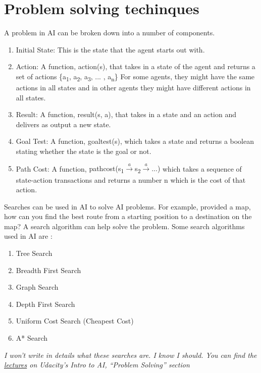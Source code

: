 \documentclass[12pt]{article}
\begin{document}
\section*{Problem solving techinques}
A problem in AI can be broken down into a number of components.
\begin{enumerate}
\item Initial State: This is the state that the agent starts out with.
\item Action: A function, \colorbox{myGray}{action(s)}, that takes in a state of the agent and returns a set of actions \colorbox{myGray}{\{a\textsubscript{1}, a\textsubscript{2}, a\textsubscript{3}, ... , a\textsubscript{n}\} }  For some agents, they might have the same actions in all states and in other agents they might have different actions in all states.
\item Result: A function, \colorbox{myGray}{result(s, a)}, that takes in a state and an action and delivers as output a new state.
\item Goal Test: A function, \colorbox{myGray}{goaltest(s)}, which takes a state and returns a boolean stating whether the state is the goal or not.
\item Path Cost: A function, \colorbox{myGray}{pathcost(s\textsubscript{1}$\xrightarrow{a}$s\textsubscript{2}$\xrightarrow{a}$...)} which takes a sequence of state-action transactions and returns a number \colorbox{myGray}{n} which is the cost of that action.
\end{enumerate}
\par
Searches can be used in AI to solve AI problems. For example, provided a map, how can you find the best route from a starting position to a destination on the map? A search algorithm can help solve the problem. Some search algorithms used in AI are :
\begin{enumerate}
\item Tree Search
\item Breadth First Search
\item Graph Search
\item Depth First Search
\item Uniform Cost Search (Cheapest Cost)
\item A* Search
\end{enumerate}
\textit{I won't write in details what these searches are. I know I should. You can find the \href{https://classroom.udacity.com/courses/cs271}{lectures} on Udacity's Intro to AI, \enquote{Problem Solving} section}
\end{document}
